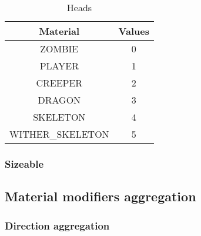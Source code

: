 \begin{table}[H]
\centering
\begin{tabular}{ |c|c| }
	\hline
	Material & Values \\
	\hline
	ZOMBIE & 0 \\
	PLAYER & 1 \\
	CREEPER & 2 \\
	DRAGON & 3 \\
	SKELETON & 4 \\
	WITHER\_SKELETON & 5 \\
	\hline
\end{tabular}
\caption{Heads}
\end{table}

\subsubsection{Sizeable}

\subsection{Material modifiers aggregation}

\subsubsection{Direction aggregation}\label{spigot-types:direction}

